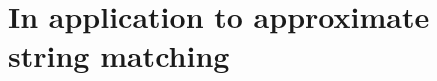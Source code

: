 \section{In application to approximate string matching}\label{sec:application-to-approximate-string-matching}
%
